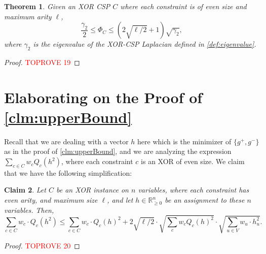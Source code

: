 \documentclass[11pt]{article}
\newtheorem{theorem}{Theorem}[section]
\newtheorem{claim}[theorem]{Claim}
\theoremstyle{definition}
\newcommand{\R}{\mathbb{R}}
\begin{document}
\begin{theorem}
    Given an XOR CSP $C$ where each constraint is of even size and maximum arity $\ell$,
    \[
    \frac{\gamma_2}{2} \leq \Phi_C \leq \left (2 \sqrt{\ell/2} + 1 \right) \sqrt{\gamma_2},
    \]
    where $\gamma_2$ is the eigenvalue of the XOR-CSP Laplacian defined in \cref{def:eigenvalue}. 
\end{theorem}

\begin{proof}\textcolor{red}{TOPROVE 19}\end{proof}




\appendix

\section{Elaborating on the Proof of \cref{clm:upperBound}}

Recall that we are dealing with a vector $h$ here which is the minimizer of $\{g^+, g^-\}$ as in the proof of \cref{clm:upperBound}, and we are analyzing the expression $\sum_{c \in C} w_c Q_c(h^2)$, where each constraint $c$ is an XOR of even size. We claim that we have the following simplification:

\begin{claim}\label{clm:simplificationProof}
    Let $C$ be an XOR instance on $n$ variables, where each constraint has even arity, and maximum size $\ell$, and let $h \in \R_{\geq 0}^n$ be an assignment to these $n$ variables. Then, 
    \[
    \sum_{c \in C} w_c \cdot Q_c(h^2) \leq \sum_{c \in C}  w_c \cdot Q_c(h)^2 + 2 \sqrt{\ell/2} \cdot \sqrt{\sum_c w_c Q_c(h)^2} \cdot \sqrt{\sum_{u \in V} w_u \cdot h_u^2}.
    \]
\end{claim}

\begin{proof}\textcolor{red}{TOPROVE 20}\end{proof}
\end{document}
